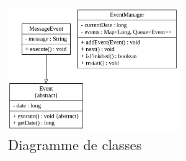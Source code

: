 \documentclass[a4paper, 11pt, french]{article}
\begin{document}
\begin{figure}[H]
    \centering
    \includegraphics[width=0.4\textwidth]{graph2.png}
    \caption{Diagramme de classes}
    \label{fig:graph2}
\end{figure}
\end{document}
